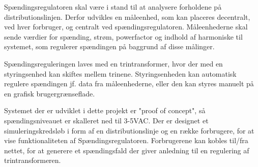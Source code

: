 

Spændingsregulatoren skal være i stand til at analysere forholdene på distributionslinjen. Derfor udvikles en måleenhed, som kan placeres decentralt, ved hver forbruger, og centralt ved spændingsregulatoren. Måleenhederne skal sende værdier for spænding, strøm, powerfactor og indhold af harmoniske til systemet, som regulerer spændingen på baggrund af disse målinger. 

Spændingsreguleringen laves med en trintransformer, hvor der med en styringsenhed kan skiftes mellem trinene. Styringsenheden kan automatisk regulere spændingen jf. data fra måleenhederne, eller den kan styres manuelt på en grafisk brugergrænseflade. 

Systemet der er udviklet i dette projekt er "proof of concept", så spændingsniveauet er skalleret ned til 3-5VAC.  Der er designet et simuleringskredsløb i form af en distributionslinje og en række forbrugere, for at vise funktionaliteten af Spændingsregulatoren. Forbrugerene  kan kobles til/fra nettet, for at generere et spændingsfald der giver anledning til en regulering af trintransformeren. 

